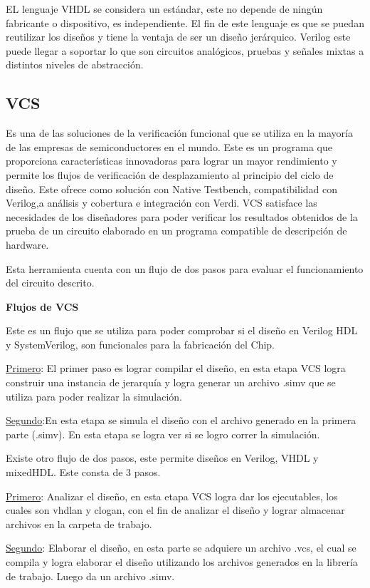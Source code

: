  EL lenguaje VHDL se considera un estándar, este no depende de ningún fabricante o dispositivo, es independiente. El fin de este lenguaje es que se puedan reutilizar los diseños y tiene la ventaja de ser un diseño jerárquico.  Verilog este puede llegar a soportar lo que son circuitos analógicos, pruebas y señales mixtas a distintos niveles de abstracción.
 \cite{DDH} 

\subsection*{VCS}

Es una de las soluciones de la verificación funcional que se utiliza en la mayoría de las empresas de semiconductores en el mundo. Este es un programa que proporciona características innovadoras para lograr un mayor rendimiento y permite los flujos de verificación de desplazamiento al principio del ciclo de diseño.
Este ofrece como solución con Native Testbench, compatibilidad con Verilog,a análisis y cobertura e integración con Verdi. VCS satisface las necesidades de los diseñadores para poder verificar los resultados obtenidos de la prueba de un circuito elaborado en un  programa compatible de descripción de hardware.

Esta herramienta cuenta con un flujo de dos pasos para evaluar el funcionamiento del circuito descrito.
 \cite{VCS} 

 
  \textbf{Flujos de VCS}  
  
  
  Este es un flujo que se utiliza para poder comprobar si el diseño en Verilog HDL y SystemVerilog, son funcionales para la fabricación del Chip.
  
  \underline{Primero}:  El primer paso es lograr compilar el diseño, en esta etapa VCS logra construir una instancia de jerarquía y logra generar un archivo .simv que se utiliza para poder realizar la simulación.
  
  \underline{Segundo}:En esta etapa se simula el diseño con el archivo generado en la primera parte (.simv). En esta etapa  se logra ver si se logro correr la simulación.
  
  Existe otro flujo de dos pasos, este permite diseños en Verilog, VHDL y mixedHDL. Este consta de 3 pasos.
  
  \underline{Primero}:  Analizar el diseño, en esta etapa VCS logra dar los ejecutables, los cuales son vhdlan y clogan, con el fin de analizar el diseño y lograr almacenar archivos en la carpeta de trabajo.
  
  \underline{Segundo}: Elaborar el diseño, en esta parte se adquiere un archivo .vcs, el cual se compila y logra elaborar el diseño utilizando los archivos generados en la librería de trabajo. Luego da un archivo .simv.
  
